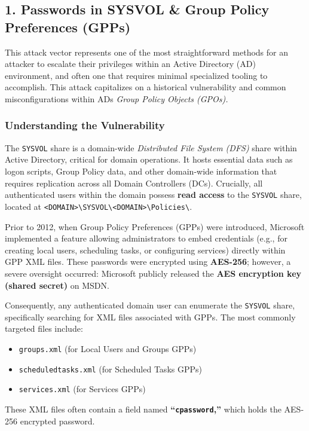 \subsection{\textbf{1. Passwords in SYSVOL \& Group Policy Preferences (GPPs)}}
This attack vector represents one of the most straightforward methods for an attacker to escalate their privileges within an Active Directory (AD) environment, and often one that requires minimal specialized tooling to accomplish. This attack capitalizes on a historical vulnerability and common misconfigurations within ADs \textit{Group Policy Objects (GPOs).}

\subsubsection{\textbf{Understanding the Vulnerability}}
The \texttt{SYSVOL} share is a domain-wide \textit{Distributed File System (DFS) }share within Active Directory, critical for domain operations. It hosts essential data such as logon scripts, Group Policy data, and other domain-wide information that requires replication across all Domain Controllers (DCs). Crucially, all authenticated users within the domain possess \textbf{read access} to the \texttt{SYSVOL} share, located at \texttt{<DOMAIN>\textbackslash{}SYSVOL\textbackslash{}<DOMAIN>\textbackslash{}Policies\textbackslash{}}.

Prior to 2012, when Group Policy Preferences (GPPs) were introduced, Microsoft implemented a feature allowing administrators to embed credentials (e.g., for creating local users, scheduling tasks, or configuring services) directly within GPP XML files. These passwords were encrypted using \textbf{AES-256}; however, a severe oversight occurred: Microsoft publicly released the \textbf{AES encryption key (shared secret)} on MSDN.

Consequently, any authenticated domain user can enumerate the \texttt{SYSVOL} share, specifically searching for XML files associated with GPPs. The most commonly targeted files include:

\begin{itemize}
    \item \texttt{groups.xml} (for Local Users and Groups GPPs)
    \item \texttt{scheduledtasks.xml} (for Scheduled Tasks GPPs)
    \item \texttt{services.xml} (for Services GPPs)
\end{itemize}

These XML files often contain a field named \textbf{“\texttt{cpassword},”} which holds the AES-256 encrypted password.

